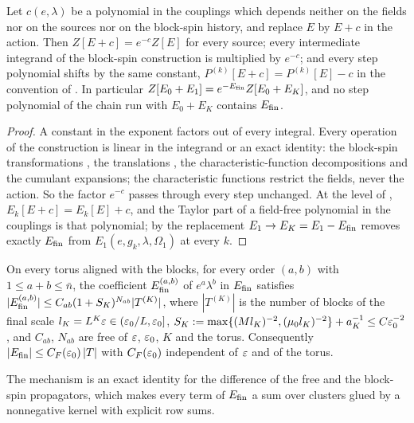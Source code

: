\begin{lemma}\label{lem:a06:CF}
Let $c(e,\lambda)$ be a polynomial in the couplings which depends neither on the fields nor on the sources nor on the block-spin history, and replace $E$ by $E+c$ in the action. Then $Z[E+c]=e^{-c}Z[E]$ for every source; every intermediate integrand of the block-spin construction is multiplied by $e^{-c}$; and every step polynomial shifts by the same constant, $P^{(k)}[E+c]=P^{(k)}[E]-c$ in the convention of \cite[(2.43)]{Ba2}. In particular $Z[E_0+E_1]=e^{-E_{\mathrm{fin}}}Z[E_0+E_K]$, and no step polynomial of the chain run with $E_0+E_K$ contains $E_{\mathrm{fin}}$.
\end{lemma}

\begin{proof}
A constant in the exponent factors out of every integral. Every operation of the construction is linear in the integrand or an exact identity: the block-spin transformations \cite[(2.18)]{Ba1}, the translations \cite[(2.80)]{Ba2}, the characteristic-function decompositions \cite[(2.15), (2.43)]{Ba2} and the cumulant expansions; the characteristic functions restrict the fields, never the action. So the factor $e^{-c}$ passes through every step unchanged. At the level of \cite[(1.4)--(1.5)]{Ba3}, $E_k[E+c]=E_k[E]+c$, and the Taylor part of a field-free polynomial in the couplings is that polynomial; by \cite[(1.30)]{Ba3} the replacement $E_1\to E_K=E_1-E_{\mathrm{fin}}$ removes exactly $E_{\mathrm{fin}}$ from $E_1(e,g_k,\lambda,\Omega_1)$ at every $k$.
\end{proof}

\begin{theorem}\label{thm:a06:F}
On every torus aligned with the blocks, for every order $(a,b)$ with $1\le a+b\le\bar n$, the coefficient $E_{\mathrm{fin}}^{(a,b)}$ of $e^a\lambda^b$ in $E_{\mathrm{fin}}$ satisfies $|E_{\mathrm{fin}}^{(a,b)}|\le C_{ab}(1+S_K)^{N_{ab}}|T^{(K)}|$, where $|T^{(K)}|$ is the number of blocks of the final scale $l_K=L^K\varepsilon\in(\varepsilon_0/L,\varepsilon_0]$, $S_K:=\max\{(Ml_K)^{-2},(\mu_0 l_K)^{-2}\}+a_K^{-1}\le C\varepsilon_0^{-2}$, and $C_{ab}$, $N_{ab}$ are free of $\varepsilon$, $\varepsilon_0$, $K$ and the torus. Consequently $|E_{\mathrm{fin}}|\le C_F(\varepsilon_0)\,|T|$ with $C_F(\varepsilon_0)$ independent of $\varepsilon$ and of the torus.
\end{theorem}

The mechanism is an exact identity for the difference of the free and the block-spin propagators, which makes every term of $E_{\mathrm{fin}}$ a sum over clusters glued by a nonnegative kernel with explicit row sums.

